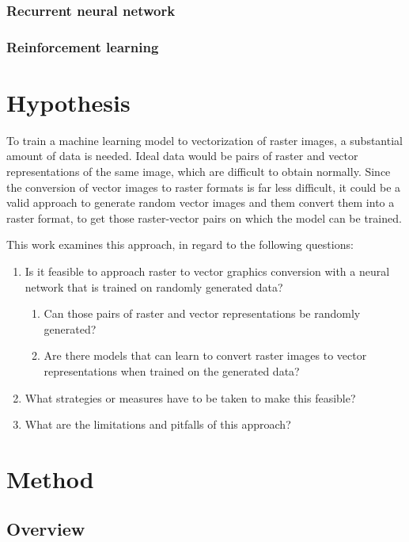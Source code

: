 \documentclass[12pt, a4paper, titlepage]{report}
\begin{document}
\subsection{Recurrent neural network}
\subsection{Reinforcement learning}



\chapter{Hypothesis}

To train a machine learning model to vectorization of raster images, a substantial amount of data is needed. Ideal data would be pairs of raster and vector representations of the same image, which are difficult to obtain normally. Since the conversion of vector images to raster formats is far less difficult, it could be a valid approach to generate random vector images and them convert them into a raster format, to get those raster-vector pairs on which the model can be trained.


This work examines this approach, in regard to the following questions:

\begin{enumerate}[label=\Roman*]
   \item Is it feasible to approach raster to vector graphics conversion with a neural network that is trained on randomly generated data?
   \begin{enumerate}
      \item Can those pairs of raster and vector representations be randomly generated?
      \item Are there models that can learn to convert raster images to vector representations when trained on the generated data?
   \end{enumerate}
   \item What strategies or measures have to be taken to make this feasible?
   \item What are the limitations and pitfalls of this approach?
\end{enumerate}


\chapter{Method}

\section{Overview}
\end{document}

